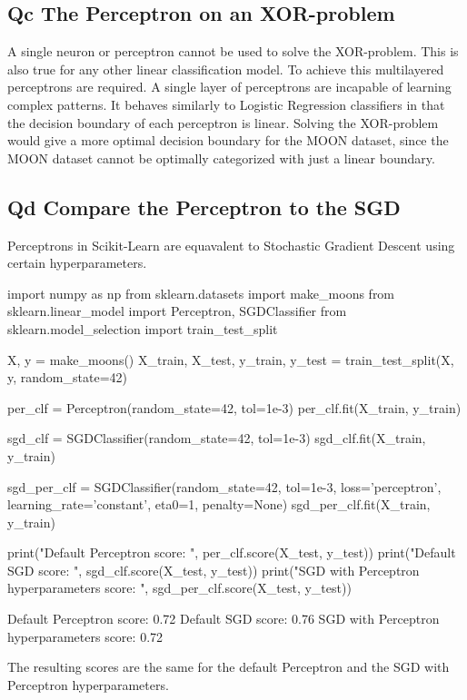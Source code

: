 \documentclass{article}
\begin{document}
\subsection{Qc The Perceptron on an XOR-problem} %

A single neuron or perceptron cannot be used to solve the XOR-problem. This is also true for any other linear classification model. To achieve this multilayered perceptrons are required.
A single layer of perceptrons are incapable of learning complex patterns. It behaves similarly to Logistic Regression classifiers in that the decision boundary of each perceptron is linear.
Solving the XOR-problem would give a more optimal decision boundary for the MOON dataset, since the MOON dataset cannot be optimally categorized with just a linear boundary.

\subsection{Qd Compare the Perceptron to the SGD}

Perceptrons in Scikit-Learn are equavalent to Stochastic Gradient Descent using certain hyperparameters.

\begin{pyminted}
import numpy as np
from sklearn.datasets import make_moons
from sklearn.linear_model import Perceptron, SGDClassifier
from sklearn.model_selection import train_test_split

X, y = make_moons()
X_train, X_test, y_train, y_test = train_test_split(X, y, random_state=42)

per_clf = Perceptron(random_state=42, tol=1e-3)
per_clf.fit(X_train, y_train)

sgd_clf = SGDClassifier(random_state=42, tol=1e-3)
sgd_clf.fit(X_train, y_train)

sgd_per_clf = SGDClassifier(random_state=42, tol=1e-3, loss='perceptron', learning_rate='constant', eta0=1, penalty=None)
sgd_per_clf.fit(X_train, y_train)

print("Default Perceptron score: ", per_clf.score(X_test, y_test))
print("Default SGD score: ", sgd_clf.score(X_test, y_test))
print("SGD with Perceptron hyperparameters score: ", sgd_per_clf.score(X_test, y_test))
\end{pyminted}
\begin{pyconsole}
Default Perceptron score:  0.72
Default SGD score:  0.76
SGD with Perceptron hyperparameters score:  0.72
\end{pyconsole}

The resulting scores are the same for the default Perceptron and the SGD with Perceptron hyperparameters.
\end{document}
